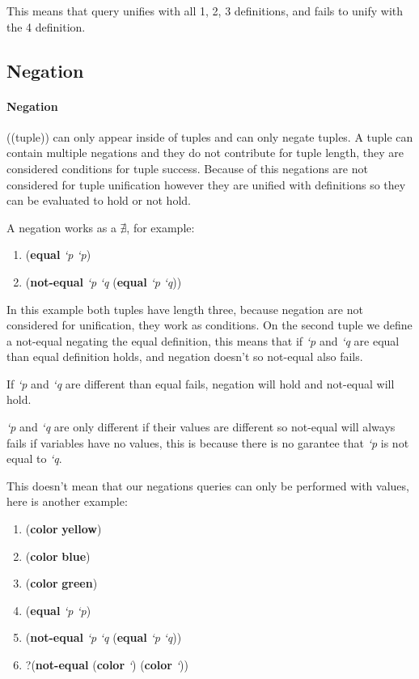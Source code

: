 \documentclass[11pt,a4paper]{report}
\newcommand{\var}[1]{`#1}
\newcommand{\zconst}[1]{\textbf{#1}}
\newcommand{\zvar}[1]{\textit{\var{#1}}}
\newcommand{\ztuple}[1]{(#1)}
\newcommand{\zneg}[1]{\textlnot \ztuple{#1}}
\newcommand{\zquery}[1]{?\ztuple{#1}}
\newcommand{\zexample}[1]{\begin{center} #1 \end{center}}
\begin{document}
    This means that query unifies with all 1, 2, 3 definitions, and fails to unify 
    with the 4 definition. 

\subsection{Negation}
    \paragraph{Negation} (\zneg{tuple}) can only appear inside of tuples and can only negate tuples.
    A tuple can contain multiple negations and they do not contribute for tuple length, they 
    are considered conditions for tuple success. Because of this negations are not considered for tuple unification 
    however they are unified with definitions so they can be evaluated to hold or not hold. 

    A negation works as a $\nexists$, for example:
    
    \zexample{
        \begin{enumerate}
            \item (\zconst{equal} \zvar{p} \zvar{p})
            \item (\zconst{not-equal} \zvar{p} \zvar{q} \zneg{\zconst{equal} \zvar{p} \zvar{q}})
        \end{enumerate}
    }
    
    In this example both tuples have length three, because negation are not considered for unification, they work as conditions.
    On the second tuple we define a not-equal negating the equal definition, this means that if \zvar{p} and \zvar{q} are equal
    than equal definition holds, and negation doesn't so not-equal also fails.
    
    If \zvar{p} and \zvar{q} are different than equal fails, negation will hold and not-equal will hold.
    
    \zvar{p} and \zvar{q} are only different if their values are different so not-equal will always fails if variables have no values, 
    this is because there is no garantee that \zvar{p} is not equal to \zvar{q}.
    
    This doesn't mean that our negations queries can only be performed with values, here is another example:
    
    \zexample{
        \begin{enumerate}
            \item \ztuple{\zconst{color} \zconst{yellow}}
            \item \ztuple{\zconst{color} \zconst{blue}}
            \item \ztuple{\zconst{color} \zconst{green}}
            \item \ztuple{\zconst{equal} \zvar{p} \zvar{p}}
            \item \ztuple{\zconst{not-equal} \zvar{p} \zvar{q} \zneg{\zconst{equal} \zvar{p} \zvar{q}}}
            \item \zquery{\zconst{not-equal} \ztuple{\zconst{color} \zvar{}} \ztuple{\zconst{color} \zvar{}}}
        \end{enumerate}
    }
\end{document}
